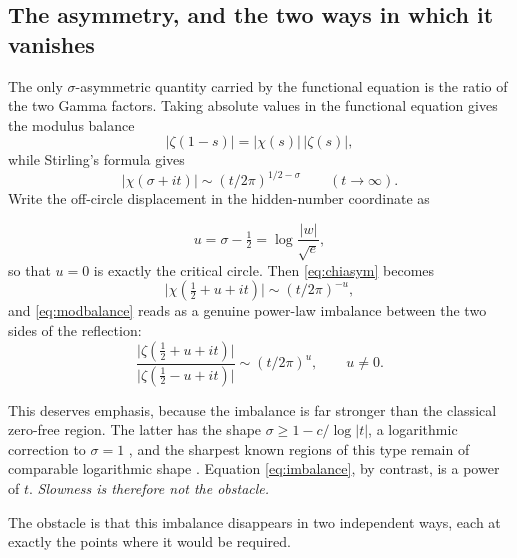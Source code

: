 \documentclass[submission,noinfoline]{jsfds}
\newcommand{\Lean}[1]{}
\newcommand{\abs}[1]{\lvert #1\rvert}
\begin{document}
\subsection{The asymmetry, and the two ways in which it vanishes}

The only $\sigma$-asymmetric quantity carried by the functional equation is
the ratio of the two Gamma factors. Taking absolute values in the functional
equation gives the modulus balance \Lean{zeta_mod_balance}
%
\begin{equation}\label{eq:modbalance}
\abs{\zeta(1-s)}=\abs{\chi(s)}\,\abs{\zeta(s)},
\end{equation}
%
while Stirling's formula gives \Lean{GammaRatioAsymmetry}
%
\begin{equation}\label{eq:chiasym}
\abs{\chi(\sigma+it)}\sim (t/2\pi)^{1/2-\sigma}\qquad (t\to\infty).
\end{equation}
%
Write the off-circle displacement in the hidden-number coordinate as
\Lean{asym_exp_log_rho}
%
\begin{equation}\label{eq:udef}
u=\sigma-\tfrac12=\log\frac{\abs w}{\sqrt e},
\end{equation}
%
so that $u=0$ is exactly the critical circle. Then \eqref{eq:chiasym} becomes
%
\begin{equation}\label{eq:chiu}
\abs{\chi(\tfrac12+u+it)}\sim (t/2\pi)^{-u},
\end{equation}
%
and \eqref{eq:modbalance} reads as a genuine power-law imbalance between the
two sides of the reflection:
%
\begin{equation}\label{eq:imbalance}
\frac{\abs{\zeta(\frac12+u+it)}}{\abs{\zeta(\frac12-u+it)}}\sim (t/2\pi)^{u},
\qquad u\neq 0.
\end{equation}

This deserves emphasis, because the imbalance is far stronger than the
classical zero-free region. The latter has the shape
$\sigma\ge 1-c/\log\abs t$, a logarithmic correction to $\sigma=1$
\citep{deLaValleePoussin1899,Titchmarsh1986}, and the sharpest known regions
of this type remain of comparable logarithmic shape
\citep{IwaniecKowalski2004}. Equation \eqref{eq:imbalance}, by contrast, is a
power of $t$. \emph{Slowness is therefore not the obstacle.}

The obstacle is that this imbalance disappears in two independent ways, each
at exactly the points where it would be required.
\end{document}
